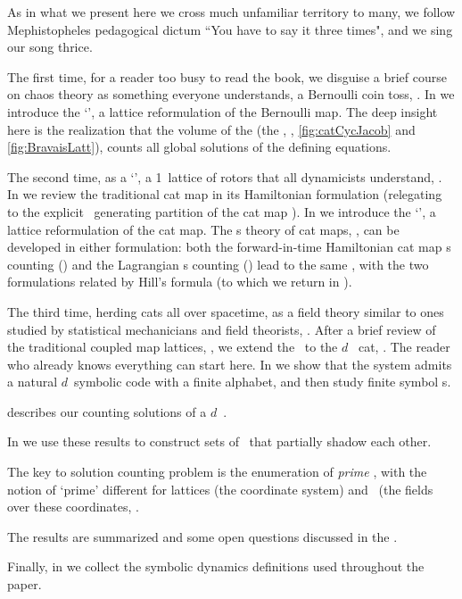 As in what we present here we cross much unfamiliar territory to many, we
follow Mephistopheles pedagogical dictum ``You have to say it three
times", and we sing our song thrice.

The first time, for a reader too busy to read the
book, we disguise a brief course on chaos theory as
something everyone understands, a Bernoulli coin toss,
.
In  we introduce the `\templatt', a lattice
reformulation of the Bernoulli map.
The deep insight here is the realization that the volume 
of the {\em\jacobianOrb} (the {\em\HillDet},
, \ref{fig:catCycJacob} and
\ref{fig:BravaisLatt}), counts all global solutions of the
defining equations.

The second time, as a `\templatt', a 1\dmn\ lattice of rotors that all
dynamicists understand, .
In  we review the traditional cat map in its
Hamiltonian formulation (relegating to  the explicit
\AW\ generating partition of the cat map \statesp).
In  we introduce the `\templatt', a lattice
reformulation of the cat map.
The \po s theory of cat maps, , can be developed
in either formulation: both the forward-in-time Hamiltonian cat map \po s
counting () and the Lagrangian {\templatt} \po s
counting () lead to the same {\tzeta}, with the
two formulations related by {Hill's formula} (to which we return in
).

The third time, herding cats all over spacetime, as a field theory
similar to ones studied by statistical mechanicians and field theorists,
.
After a brief review of the traditional coupled map lattices,
, we extend the \templatt\ to the $d$\dmn\ {\em\spt} cat,
. The reader who already knows everything can start
here.
In  we show that the system admits  a natural
$d$\dmn\ symbolic  code with a finite alphabet, and then study finite
{\spt} symbol \brick s.

describes our counting solutions of a
$d$\dmn\ \catlatt.

In   we use these  results to construct
sets of {\spt} \twots\ that partially shadow each other.

The key to solution counting problem is the enumeration of \emph{prime}
{\twots}, with the notion of `prime' different for
lattices (the coordinate system) and \twots\ (the fields over these
coordinates, .

The results are summarized and some open questions discussed in the
.

Finally, in  we collect the symbolic dynamics
definitions used throughout the paper.
